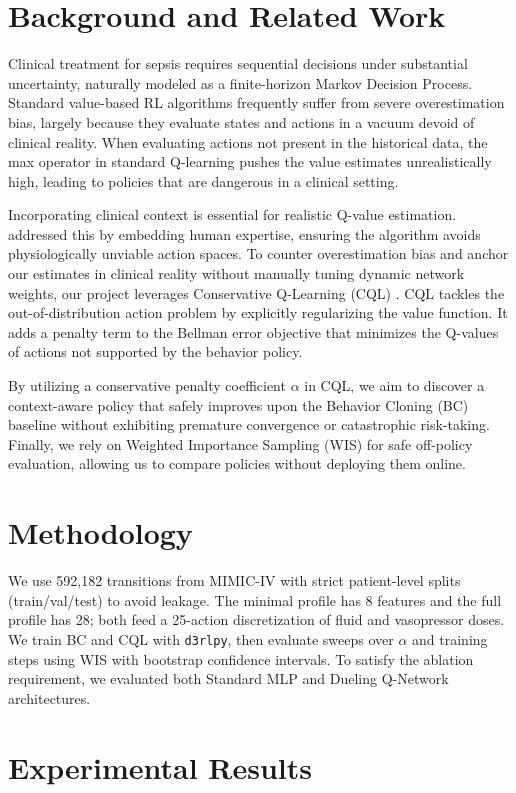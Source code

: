 \documentclass[11pt]{article}
\begin{document}
\section{Background and Related Work}
Clinical treatment for sepsis requires sequential decisions under substantial uncertainty, naturally modeled as a finite-horizon Markov Decision Process. Standard value-based RL algorithms frequently suffer from severe overestimation bias, largely because they evaluate states and actions in a vacuum devoid of clinical reality. When evaluating actions not present in the historical data, the max operator in standard Q-learning pushes the value estimates unrealistically high, leading to policies that are dangerous in a clinical setting. 

Incorporating clinical context is essential for realistic Q-value estimation. \citet{wu2023} addressed this by embedding human expertise, ensuring the algorithm avoids physiologically unviable action spaces. To counter overestimation bias and anchor our estimates in clinical reality without manually tuning dynamic network weights, our project leverages Conservative Q-Learning (CQL) \citep{kumar2020}. CQL tackles the out-of-distribution action problem by explicitly regularizing the value function. It adds a penalty term to the Bellman error objective that minimizes the Q-values of actions not supported by the behavior policy. 

By utilizing a conservative penalty coefficient $\alpha$ in CQL, we aim to discover a context-aware policy that safely improves upon the Behavior Cloning (BC) baseline without exhibiting premature convergence or catastrophic risk-taking. Finally, we rely on Weighted Importance Sampling (WIS) for safe off-policy evaluation, allowing us to compare policies without deploying them online.
\section{Methodology}
We use 592,182 transitions from MIMIC-IV with strict patient-level splits (train/val/test) to avoid leakage. The minimal profile has 8 features and the full profile has 28; both feed a 25-action discretization of fluid and vasopressor doses. We train BC and CQL with \texttt{d3rlpy}, then evaluate sweeps over $\alpha$ and training steps using WIS with bootstrap confidence intervals.
To satisfy the ablation requirement, we evaluated both Standard MLP and Dueling Q-Network architectures.

\section{Experimental Results}
\end{document}
